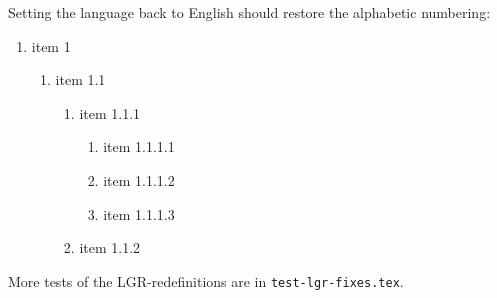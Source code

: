 \documentclass[a4paper]{article}
\newcommand{\file}{\texttt}
\begin{document}
Setting the language back to English should restore the alphabetic numbering:
\begin{enumerate}
  \item item 1
  \begin{enumerate}
    \item item 1.1
    \begin{enumerate}
      \item item 1.1.1
       \begin{enumerate}
         \item item 1.1.1.1
         \item item 1.1.1.2
         \item item 1.1.1.3
       \end{enumerate}
      \item item 1.1.2
    \end{enumerate}
  \end{enumerate}
\end{enumerate}

More tests of the LGR-redefinitions are in \file{test-lgr-fixes.tex}.

\ifdefined\lgrfont
\else
  
\end{document}
